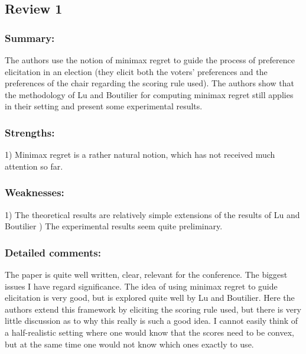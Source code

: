 \documentclass[version=3.21, pagesize, twoside=off, bibliography=totoc, DIV=calc, fontsize=12pt, a4paper]{scrartcl}
\begin{document}
\subsection{Review 1}
\subsubsection*{Summary:}	The authors use the notion of minimax regret to guide the process of preference elicitation in an election (they elicit both the voters' preferences and the preferences of the chair regarding the scoring rule used). The authors show that the methodology of Lu and Boutilier for computing minimax regret still applies in their setting and present some experimental results.
\subsubsection*{Strengths:}	1) Minimax regret is a rather natural notion, which has not received much attention so far.
\subsubsection*{Weaknesses:}
1) The theoretical results are relatively simple extensions of the results of Lu and Boutilier
) The experimental results seem quite preliminary.

\subsubsection*{Detailed comments:}	The paper is quite well written, clear, relevant for the conference. The biggest issues I have regard significance. The idea of using minimax regret to guide elicitation is very good, but is explored quite well by Lu and Boutilier. Here the authors extend this framework by eliciting the scoring rule used, but there is very little discussion as to why this really is such a good idea. I cannot easily think of a half-realistic setting where one would know that the scores need to be convex, but at the same time one would not know which ones exactly to use.
\end{document}
